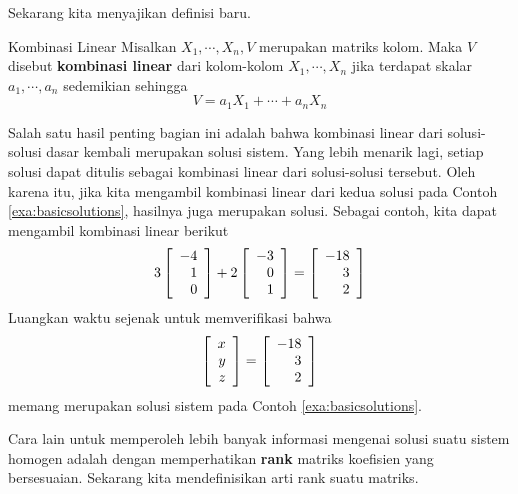 Sekarang kita menyajikan definisi baru.

\begin{definition}{Kombinasi Linear}\label{def:linearcombination-columns}
Misalkan $X_1,\cdots ,X_n,V$ merupakan matriks kolom. Maka
$V$ disebut \textbf{kombinasi linear}
dari kolom-kolom $X_1,\cdots , X_n $
jika terdapat skalar $a_{1},\cdots ,a_{n}$ sedemikian
sehingga
\begin{equation*}
V = a_1 X_1 + \cdots + a_n X_n
\end{equation*}
\end{definition}

Salah satu hasil penting bagian ini adalah bahwa kombinasi linear dari solusi-solusi dasar kembali merupakan solusi sistem.
Yang lebih menarik lagi, setiap solusi dapat ditulis sebagai kombinasi linear dari solusi-solusi tersebut.
Oleh karena itu, jika kita mengambil kombinasi linear dari kedua solusi pada Contoh \ref{exa:basicsolutions},
hasilnya juga merupakan solusi.
Sebagai contoh, kita dapat mengambil kombinasi linear berikut
\begin{equation*}
3
\left[
\begin{array}{r}
-4 \\
1 \\
0
\end{array}
\right]
+
2
\left[
\begin{array}{r}
-3 \\
0\\
1
\end{array}
\right]
 =
\left[
\begin{array}{r}
-18 \\
3 \\
2
\end{array}
\right]
\end{equation*}
Luangkan waktu sejenak untuk memverifikasi bahwa
\begin{equation*}
\left[
\begin{array}{r}
x \\
y \\
z
\end{array}
\right]
=
\left[
\begin{array}{r}
-18 \\
3 \\
2
\end{array}
\right]
\end{equation*}
memang merupakan solusi sistem pada Contoh \ref{exa:basicsolutions}.

Cara lain untuk memperoleh lebih banyak informasi mengenai solusi
suatu sistem homogen adalah dengan memperhatikan \textbf{rank} matriks koefisien yang bersesuaian. Sekarang kita
mendefinisikan arti rank suatu matriks.

